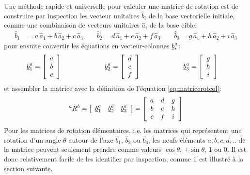 Une méthode rapide et universelle pour calculer une matrice de rotation est de construire par inspection les vecteur unitaires $\hat{b}_i$ de la base vectorielle initiale, comme une combinaison de vecteurs unitaires $\hat{a}_i$ de la base cible:
\begin{align}
\hat{b}_1 &= a \, \hat{a}_1 + b \, \hat{a}_2 + c \, \hat{a}_3  \quad\quad  \hat{b}_2 = d \, \hat{a}_1 + e \, \hat{a}_2 + f \, \hat{a}_3   \quad\quad  \hat{b}_3 = g \, \hat{a}_1 + h \, \hat{a}_2 + i \, \hat{a}_3 
\end{align} 
pour ensuite convertir les équations en vecteur-colonnes $\underline{b}_i^a$:
\begin{align}
\underline{b}_1^a  &= \left[ \begin{array}{c} a \\ b \\ c  \end{array} \right] \quad\quad\quad\quad\quad\quad\;  
\underline{b}_2^a  = \left[ \begin{array}{c} d \\ e \\ f  \end{array} \right]  \quad\quad\quad\quad\quad\quad\; 
\underline{b}_3^a  = \left[ \begin{array}{c} g \\ h \\ i  \end{array} \right] 
\end{align} 
et assembler la matrice avec la définition de l'équation \eqref{eq:matricerotcol}:
\begin{align}
{}^aR^b = 
\left[ \begin{array}{c c c} 
\underline{b}_1^a &  \underline{b}_2^a & \underline{b}_3^a
\end{array} \right] 
=
\left[ \begin{array}{c c c} 
a & d & g \\ 
b & e & h \\ 
c & f & i 
\end{array} \right]
\end{align} 
Pour les matrices de rotation élémentaires, i.e. les matrices qui représentent une rotation d'un angle $\theta$ autour de l'axe $\hat{b}_1$, $\hat{b}_2$ ou $\hat{b}_3$, les neufs éléments $a,b,c,d,..$ de la matrice peuvent seulement prendre comme valeurs $\cos \theta$, $\pm \sin \theta$, $1$ ou $0$. Il est donc relativement facile de les identifier par inspection, comme il est illustré à la section suivante.

